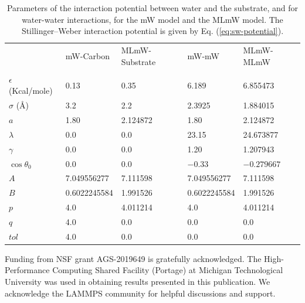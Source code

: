 \documentclass[journal abbreviation, manuscript]{copernicus}
\begin{document}
\begin{table}
\begin{tabular}{ |p{1.95cm}||p{3.0cm}|p{3.0cm}|p{3.0cm}|p{3.0cm}|  }
 \hline
 & mW-Carbon  & MLmW-Substrate & mW-mW  &  MLmW-MLmW \\
& \citep{lupi2014}  & & \citep{molinero2009} &  \citep{chan2019} \\
 \hline
 $\epsilon$ (Kcal/mole)    & 0.13          & 0.35      & 6.189         & 6.855473  \\
 $\sigma$ (\AA{})      & 3.2           & 2.2       & 2.3925        & 1.884015\\
 $a$                      & 1.80          & 2.124872  & 1.80          & 2.124872  \\
 $\lambda$                 & 0.0           & 0.0       & 23.15         & 24.673877 \\
 $\gamma$                  & 0.0           & 0.0       & 1.20          & 1.207943  \\
 $\cos\theta_0$              & 0.0           & 0.0       & $-0.33$         & $-0.279667$ \\
 $A$                      & 7.049556277   & 7.111598  & 7.049556277   & 7.111598  \\
 $B$                      & 0.6022245584  & 1.991526  & 0.6022245584  & 1.991526  \\
 $p$                      & 4.0           & 4.011214  & 4.0           & 4.011214  \\
 $q$                      & 4.0           & 0.0       & 0.0           & 0.0       \\
 $tol$                    & 4.0           & 0.0       & 0.0           & 0.0       \\
 \hline
\end{tabular}
\caption{Parameters of the interaction potential between water and the substrate, and for water-water interactions, for the mW model and the MLmW model. The Stillinger--Weber interaction potential is given by Eq. (\ref{eq:sw-potential}). \label{Tab:potentials}}
\end{table}





\begin{acknowledgements}
Funding from NSF grant AGS-2019649 is gratefully acknowledged. The High-Performance Computing Shared Facility (Portage) at Michigan Technological University was used in obtaining results presented in this publication. We acknowledge the LAMMPS community for helpful discussions and support.
\end{acknowledgements}

%


\end{document}

